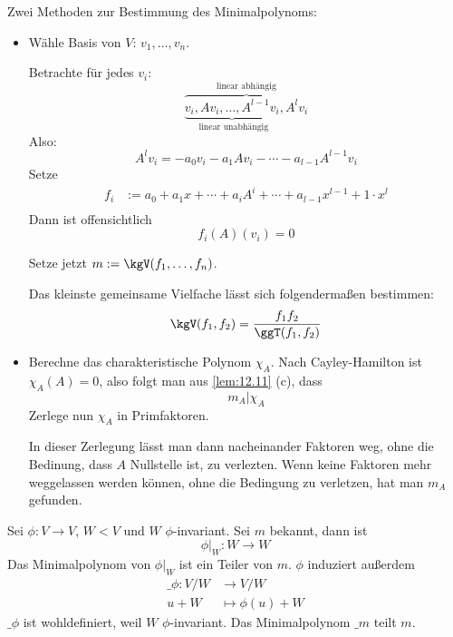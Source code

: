 \documentclass[a4paper, 10pt]{scrbook}
\begin{document}
\begin{note}
	Zwei Methoden zur Bestimmung des Minimalpolynoms:
	\begin{itemize}
		\item
			Wähle Basis von $V$: $v_1,\dotsc,v_n$.

			Betrachte für jedes $v_i$:
			\[
				\overbrace{\underbrace{v_i, Av_i, \dotsc, A^{l-1}v_i}_{\text{ linear unabhängig}}, A^lv_i}^{\text{linear abhängig}}
			\]
			Also:
			\[
				A^lv_i = -a_0v_i - a_1Av_i - \dotsb - a_{l-1}A^{l-1}v_i
			\]
			Setze
			\begin{align*}
				f_i &:= a_0 + a_1x+\dotsb +a_{i}A^i+ \dotsb + a_{l-1}x^{l-1}+1\cdot x^l\\
			\end{align*}
			Dann ist offensichtlich
			\[ 
				f_i(A)(v_i) = 0
			\]

			Setze jetzt $m:= \kgV(f_1,\dotsc, f_n)$.
			\begin{note}
				Das kleinste gemeinsame Vielfache lässt sich folgendermaßen bestimmen:
				\[
					\kgV(f_1,f_2) = \frac {f_1f_2}{\ggT(f_1,f_2)}
				\]
			\end{note}
		\item
			Berechne das charakteristische Polynom $\chi_A$.
			Nach Cayley-Hamilton ist $\chi_A(A)=0$, also folgt man aus \ref{lem:12.11} (c), dass
			\[
				m_A | \chi_A
			\]
			Zerlege nun $\chi_A$ in Primfaktoren.
			
			In dieser Zerlegung lässt man dann nacheinander Faktoren weg, ohne die Bedinung, dass $A$ Nullstelle ist, zu verlezten.
			Wenn keine Faktoren mehr weggelassen werden können, ohne die Bedingung zu verletzen, hat man $m_A$ gefunden.
	\end{itemize}
\end{note}

Sei $\phi: V\to V$, $W<V$ und $W$ $\phi$-invariant.
Sei $m$ bekannt, dann ist
\[
	\phi|_W : W\to W
\]
Das Minimalpolynom von $\phi|_W$ ist ein Teiler von $m$.
$\phi$ induziert außerdem
\begin{align*}
	\_\phi: V/W &\to V/W\\
	u+W &\mapsto \phi(u)+W
\end{align*}
$\_\phi$ ist wohldefiniert, weil $W$ $\phi$-invariant.
Das Minimalpolynom $\_m$ teilt $m$.
\end{document}
